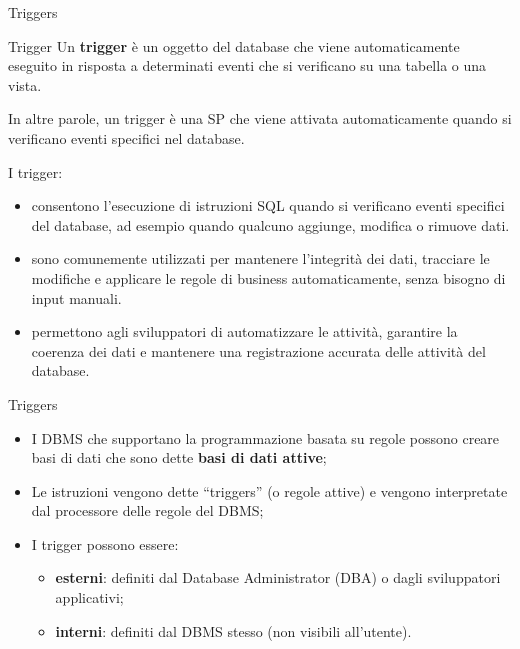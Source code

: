 \begin{frame}[fragile]{Triggers}
\vspace{-.7cm}
\begin{minipage}{.85\textwidth}
\begin{block}{Trigger}
Un \textbf{trigger} \`e un oggetto del database che viene automaticamente eseguito in risposta a determinati eventi che si verificano su una tabella o una vista.

In altre parole, un trigger \`e una SP che viene attivata automaticamente quando si verificano eventi specifici nel database.
\end{block}
\end{minipage}

\vspace{.2cm}

I trigger:
\begin{itemize}[<+->]
    \item consentono l'esecuzione di istruzioni SQL quando si verificano eventi specifici del database, ad esempio quando qualcuno aggiunge, modifica o rimuove dati.
    \item sono comunemente utilizzati per mantenere l'integrit\`a dei dati, tracciare le modifiche e applicare le regole di business automaticamente, senza bisogno di input manuali.
    \item permettono agli sviluppatori di automatizzare le attivit\`a, garantire la coerenza dei dati e mantenere una registrazione accurata delle attivit\`a del database.
\end{itemize}
\end{frame}
%
\begin{frame}{Triggers}
    \begin{itemize}
        \item I DBMS che supportano la programmazione basata su regole possono creare basi di dati che sono dette \textbf{basi di dati attive};
        \item Le istruzioni vengono dette ``triggers'' (o regole attive) e vengono interpretate dal processore delle regole del DBMS;
        \item I trigger possono essere:
            \begin{itemize}
                \item \textbf{esterni}: definiti dal Database Administrator (DBA) o dagli sviluppatori applicativi;
                \item \textbf{interni}: definiti dal DBMS stesso (non visibili all'utente).
            \end{itemize}
    \end{itemize}
\end{frame}
